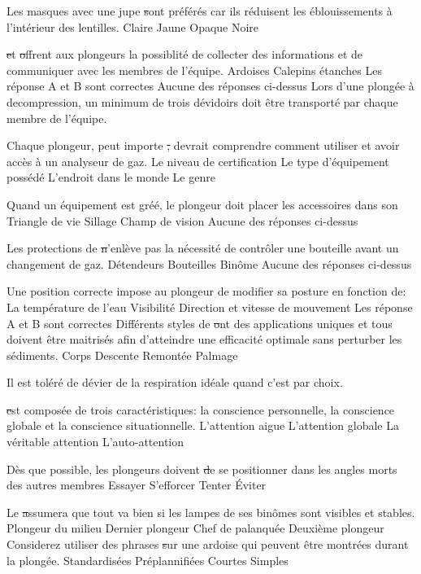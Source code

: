 \documentclass[english,10pt,twoside]{article}
\begin{document}
\begin{outline}
		\1 Les masques avec une jupe \st sont préférés car ils réduisent les éblouissements à l'intérieur des lentilles.
			\2 Claire
			\2 Jaune
			\2 Opaque
			\2 Noire

		\1 \st et \st offrent aux plongeurs la possiblité de collecter des informations et de communiquer avec les membres de l'équipe.
			\2 Ardoises
			\2 Calepins	étanches
			\2 Les réponse A et B sont correctes
			\2 Aucune des réponses ci-dessus
		\1 Lors d'une plongée à decompression, un minimum de trois dévidoirs doit être transporté par chaque membre de l'équipe.\vf

		\1 Chaque plongeur, peut importe \st, devrait comprendre comment utiliser et avoir accès à un analyseur de gaz.
			\2 Le niveau de certification
			\2 Le type d'équipement possédé
			\2 L'endroit dans le monde
			\2 Le genre

		\1 Quand un équipement est gréé, le plongeur doit placer les accessoires dans son \st
			\2 Triangle de vie
			\2 Sillage
			\2 Champ de vision
			\2 Aucune des réponses ci-dessus

		\1 Les protections de \st n'enlève pas la nécessité de contrôler une bouteille avant un changement de gaz.
			\2 Détendeurs
			\2 Bouteilles
			\2 Binôme
			\2 Aucune des réponses ci-dessus

		\1 Une position correcte impose au plongeur de modifier sa posture en fonction de:
			\2 La température de l'eau
			\2 Visibilité
			\2 Direction et vitesse de mouvement
			\2 Les réponse A et B sont correctes
		\1 Différents styles de \st ont des applications uniques et tous doivent être maitrisés afin d'atteindre une efficacité optimale sans perturber les sédiments.
			\2 Corps
			\2 Descente
			\2 Remontée
			\2 Palmage

		\1 Il est toléré de dévier de la respiration idéale quand c'est par choix. \vf

		\1 \st est composée de trois caractéristiques: la conscience personnelle, la conscience globale et la conscience situationnelle.
			\2 L'attention aigue
			\2 L'attention globale
			\2 La véritable attention
			\2 L'auto-attention

		\1 Dès que possible, les plongeurs doivent \st de se positionner dans les angles morts des autres membres
			\2 Essayer
			\2 S'efforcer
			\2 Tenter
			\2 Éviter

		\1 Le  \st assumera que tout va bien si les lampes de ses binômes sont visibles et stables.
			\2 Plongeur du milieu
			\2 Dernier plongeur
			\2 Chef de palanquée
			\2 Deuxième plongeur
		\1 Considerez utiliser des phrases \st sur une ardoise qui peuvent être montrées durant la plongée.
			\2 Standardisées
			\2 Préplannifiées
			\2 Courtes
			\2 Simples


\end{outline}
\end{document}
